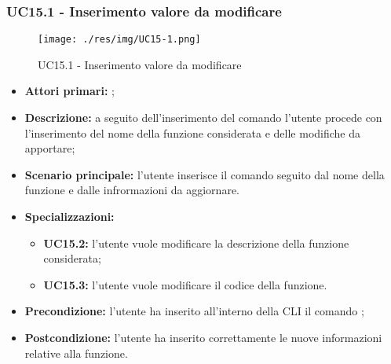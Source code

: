 \subsubsection{UC15.1 - Inserimento valore da modificare}
\begin{figure}[H]
	\centering
	\texttt{[image: ./res/img/UC15-1.png]}
	\caption {UC15.1 - Inserimento valore da modificare}
\end{figure}
\begin{itemize}
	\item \textbf{Attori primari:} \us{};
	\item \textbf{Descrizione:} a seguito dell'inserimento del comando \edit{} l’utente procede con l’inserimento del nome della funzione considerata e delle modifiche da apportare; 
	\item \textbf{Scenario principale:} l'utente inserisce il comando \edit{} seguito dal nome della funzione e dalle infrormazioni da aggiornare. 
	\item \textbf{Specializzazioni:} 
	\begin{itemize}
		\item \textbf{UC15.2:} l’utente vuole modificare la descrizione della funzione considerata; 
		\item \textbf{UC15.3:} l’utente vuole modificare il codice della funzione. 
	\end{itemize}
	\item \textbf{Precondizione:} l’utente ha inserito all’interno della CLI il comando \edit{}; 
	\item \textbf{Postcondizione:} l’utente ha inserito correttamente le nuove informazioni relative alla funzione.
\end{itemize}